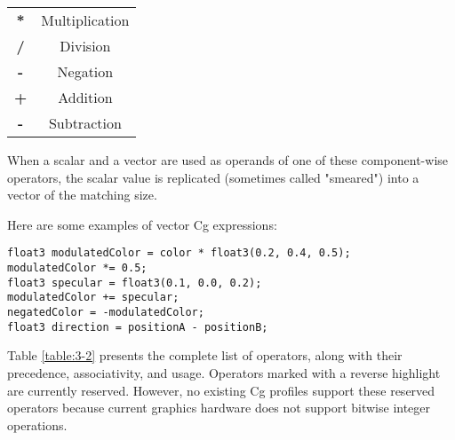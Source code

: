 \documentclass[../main.tex]{subfiles}
\begin{document}
\FloatBarrier
\begin{tabular}{ |c|c| } 
\textbf{*} & Multiplication \\
\textbf{/} & Division \\
\textbf{-} & Negation \\
\textbf{+} & Addition \\
\textbf{-} & Subtraction \\
\end{tabular}
\FloatBarrier

When a scalar and a vector are used as operands of one of these component-wise operators, the scalar value is replicated (sometimes called "smeared") into a vector of the matching size.

Here are some examples of vector Cg expressions:

\FloatBarrier
\begin{lstlisting}
float3 modulatedColor = color * float3(0.2, 0.4, 0.5);
modulatedColor *= 0.5;
float3 specular = float3(0.1, 0.0, 0.2);
modulatedColor += specular;
negatedColor = -modulatedColor;
float3 direction = positionA - positionB;
\end{lstlisting}
\FloatBarrier

Table \ref{table:3-2} presents the complete list of operators, along with their precedence, associativity, and usage. Operators marked with a reverse highlight are currently reserved. However, no existing Cg profiles support these reserved operators because current graphics hardware does not support bitwise integer operations.
\end{document}
